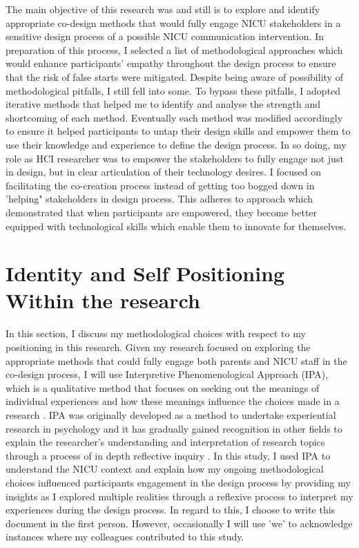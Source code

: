  The main objective of this research was and still is to explore and identify appropriate co-design methods that would fully engage NICU stakeholders in a sensitive design process of a possible NICU communication intervention. In preparation of this process, I selected a list of methodological approaches which would enhance participants' empathy throughout the design process to ensure that the risk of false starts were mitigated. Despite being aware of possibility of methodological pitfalls, I still fell into some. To bypass these pitfalls, I adopted iterative methods that helped me to identify and analyse the strength and shortcoming of each method. Eventually each method was modified accordingly to ensure it helped participants to untap their design skills and empower them to use their knowledge and experience to define the design process. In so doing, my role as HCI researcher was to empower the stakeholders to fully engage not just in design, but in clear articulation of their technology desires. I focused on facilitating the co-creation process instead of getting too bogged down in 'helping" stakeholders in design process. This adheres to \textcite{Rogers2013} approach which demonstrated that when participants are empowered, they become better equipped with technological skills which enable them to innovate for themselves.
 

\section{Identity and Self Positioning Within the research}
In this section, I discuss my methodological choices with respect to my positioning in this research. Given my research focused on exploring the appropriate methods that could fully engage both parents and NICU staff in the co-design process, I will use Interpretive Phenomenological Approach (IPA), which is a qualitative method that focuses on seeking out the meanings of individual experiences and how these meanings influence the choices made in a research \citep{peat2019, Smith2007}. IPA was originally developed as a method to undertake experiential research in psychology and it has gradually gained recognition in other fields to explain the researcher's understanding and interpretation of research topics through a process of in depth
reflective inquiry \citep{Smith1996}. In this study, I used IPA to understand the NICU context and explain how my ongoing methodological choices influenced participants engagement in the design process by providing my insights as I explored multiple realities through a reflexive process to interpret my experiences during the design process. In regard to this, I choose to write this document in the first person. However, occasionally  I will use 'we' to acknowledge instances where my colleagues contributed to this study.

